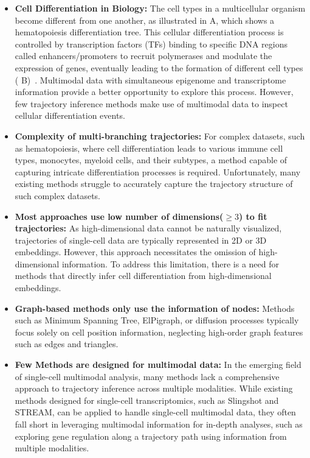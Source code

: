 \begin{itemize}
	\item \textbf{Cell Differentiation in Biology:}
	The cell types in a multicellular organism become different from one another, as illustrated in  A, which shows a hematopoiesis differentiation tree. This cellular differentiation process is controlled by transcription factors (TFs) binding to specific DNA regions called enhancers/promoters to recruit polymerases and modulate the expression of genes, eventually leading to the formation of different cell types ( B)~\citep{costa2023dissecting}. Multimodal data with simultaneous epigenome and transcriptome information provide a better opportunity to explore this process. However, few trajectory inference methods make use of multimodal data to inspect cellular differentiation events.


	\item \textbf{Complexity of multi-branching trajectories:}
	For complex datasets, such as hematopoiesis, where cell differentiation leads to various immune cell types, monocytes, myeloid cells, and their subtypes, a method capable of capturing intricate differentiation processes is required. Unfortunately, many existing methods struggle to accurately capture the trajectory structure of such complex datasets.


	\item \textbf{Most approaches use low number of dimensions($\geq3$) to fit trajectories:}
	As high-dimensional data cannot be naturally visualized, trajectories of single-cell data are typically represented in 2D or 3D embeddings. However, this approach necessitates the omission of high-dimensional information. To address this limitation, there is a need for methods that directly infer cell differentiation from high-dimensional embeddings.

	\item \textbf{Graph-based methods only use the information of nodes:}
	Methods such as Minimum Spanning Tree, ElPigraph, or diffusion processes typically focus solely on cell position information, neglecting high-order graph features such as edges and triangles.

	\item \textbf{Few Methods are designed for multimodal data:}
	In the emerging field of single-cell multimodal analysis, many methods lack a comprehensive approach to trajectory inference across multiple modalities. While existing methods designed for single-cell transcriptomics, such as Slingshot and STREAM, can be applied to handle single-cell multimodal data, they often fall short in leveraging multimodal information for in-depth analyses, such as exploring gene regulation along a trajectory path using information from multiple modalities.
\end{itemize}

